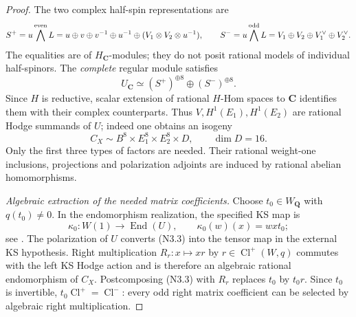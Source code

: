 \documentclass[10pt,reqno]{article}
\theoremstyle{emphasizedplain}
\theoremstyle{emphasizeddefinition}
\theoremstyle{emphasizeddefinition}
\DeclareMathOperator{\End}{End}
\newcommand{\Q}{\mathbf Q}
\newcommand{\C}{\mathbf C}
\begin{document}
\begin{proof}
The two complex half-spin representations are
\[
 S^+=u\bigwedge^{\rm even}L
  =u\oplus v\oplus v^{-1}\oplus u^{-1}
      \oplus(V_1\otimes V_2\otimes u^{-1}),
\qquad
 S^-=u\bigwedge^{\rm odd}L
  =V_1\oplus V_2\oplus V_1^\vee\oplus V_2^\vee.
\]
The equalities are of $H_\C$-modules; they do not posit rational
models of individual half-spinors. The \emph{complete} regular module
satisfies
\[
 U_\C\simeq(S^+)^{\oplus8}\oplus(S^-)^{\oplus8}.
\]
Since $H$ is reductive, scalar extension of rational $H$-Hom
spaces to $\C$ identifies them with their complex counterparts.
Thus $V,H^1(E_1),H^1(E_2)$ are rational Hodge summands of $U$;
indeed one obtains an isogeny
\[
               C_X\sim B^8\times E_1^8\times E_2^8\times D,
               \qquad\dim D=16.                       \tag{N3.2}
\]
Only the first three types of factors are needed. Their rational
weight-one inclusions, projections and polarization adjoints are
induced by rational abelian homomorphisms.

\emph{Algebraic extraction of the needed matrix coefficients.}
Choose $t_0\in W_\Q$ with $q(t_0)\ne0$. In the endomorphism
realization, the specified KS map is
\[
 \kappa_0:W(1)\longrightarrow\End(U),\qquad
 \kappa_0(w)(x)=wxt_0;
                                                        \tag{N3.3}
\]
see \cite[Chapter 4, Proposition 2.6 and Remark 2.7]{HuybrechtsK3}.
The polarization of $U$ converts (N3.3) into the tensor map in the
external KS hypothesis. Right multiplication $R_r:x\mapsto xr$ by
$r\in\operatorname{Cl}^+(W,q)$ commutes with the left KS Hodge
action and is therefore an algebraic rational endomorphism of $C_X$.
Postcomposing (N3.3) with $R_r$ replaces $t_0$ by $t_0r$.
Since $t_0$ is invertible, $t_0\operatorname{Cl}^+=\operatorname{Cl}^-$:
every odd right matrix coefficient can be selected by algebraic
right multiplication.


\end{proof}
\end{document}
